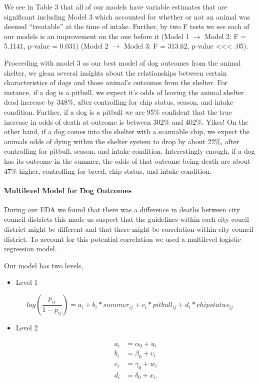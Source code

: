 \documentclass[]{article}
\providecommand{\tightlist}{%
  \setlength{\itemsep}{0pt}\setlength{\parskip}{0pt}}
\let\oldparagraph\paragraph
\renewcommand{\paragraph}[1]{\oldparagraph{#1}\mbox{}}
\begin{document}
We see in Table 3 that all of our models have variable estimates that
are significant including Model 3 which accounted for whether or not an
animal was deemed ``treatable'' at the time of intake. Further, by two F
tests we see each of our models is an improvement on the one before it
(Model 1 \(\rightarrow\) Model 2: F = 5.1141, p-value = 0.031) (Model 2
\(\rightarrow\) Model 3: F = 313.62, p-value
\textless{}\textless{}\textless{} .05).

Procceding with model 3 as our best model of dog outcomes from the
animal shelter, we glean several insights about the relationships
between certain characteristics of dogs and those animal's outcomes from
the shelter. For instance, if a dog is a pitbull, we expect it's odds of
leaving the animal shelter dead increase by 348\%, after controlling for
chip status, season, and intake condition. Further, if a dog is a
pitbull we are 95\% confident that the true increase in odds of death at
outcome is between 302\% and 402\%. Yikes! On the other hand, if a dog
comes into the shelter with a scannable chip, we expect the animals odds
of dying within the shelter system to drop by about 22\%, after
controlling for pitbull, season, and intake condition. Interestingly
enough, if a dog has its outcome in the summer, the odds of that outcome
being death are about 47\% higher, controlling for breed, chip status,
and intake condition.

\paragraph{Multilevel Model for Dog
Outcomes}\label{multilevel-model-for-dog-outcomes}

During our EDA we found that there was a difference in deaths between
city council districts this made us suspect that the guidelines within
each city coucil district might be different and that there might be
correlation within city council district. To account for this potential
correlation we used a multilevel logistic regression model.

Our model has two levels,

\begin{itemize}
\tightlist
\item
  Level 1
\end{itemize}

\[log(\frac{p_{ij}}{1-p_{ij}})=a_i+b_i*summer_{ij}+c_i*pitbull_{ij}+d_i*chipstatus_{ij}\]

\begin{itemize}
\tightlist
\item
  Level 2

  \begin{eqnarray*}  
    a_i&=\alpha_0+u_i\\
    b_i&=\beta_0+v_i\\
    c_i&=\gamma_0+w_i\\
    d_i&=\delta_0+x_i.
  \end{eqnarray*}
\end{itemize}
\end{document}
